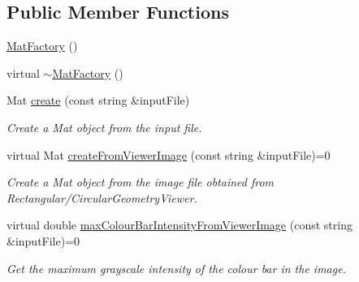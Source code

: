 \subsection*{Public Member Functions}
\begin{DoxyCompactItemize}
\item 
\hyperlink{classmultiscale_1_1analysis_1_1MatFactory_a454ca2abfbeb664e75f5365ac00eacff}{Mat\-Factory} ()
\item 
virtual \hyperlink{classmultiscale_1_1analysis_1_1MatFactory_aa339532cb504caebcf9ece2c847f4847}{$\sim$\-Mat\-Factory} ()
\item 
Mat \hyperlink{classmultiscale_1_1analysis_1_1MatFactory_a7800a989d808037fe96a9d5a692909b0}{create} (const string \&input\-File)
\begin{DoxyCompactList}\small\item\em Create a Mat object from the input file. \end{DoxyCompactList}\item 
virtual Mat \hyperlink{classmultiscale_1_1analysis_1_1MatFactory_a719ca9ac925ee182c1d5df1b0b029394}{create\-From\-Viewer\-Image} (const string \&input\-File)=0
\begin{DoxyCompactList}\small\item\em Create a Mat object from the image file obtained from Rectangular/\-Circular\-Geometry\-Viewer. \end{DoxyCompactList}\item 
virtual double \hyperlink{classmultiscale_1_1analysis_1_1MatFactory_a041b354357794476a2108e3f71deadc8}{max\-Colour\-Bar\-Intensity\-From\-Viewer\-Image} (const string \&input\-File)=0
\begin{DoxyCompactList}\small\item\em Get the maximum grayscale intensity of the colour bar in the image. \end{DoxyCompactList}\end{DoxyCompactItemize}
